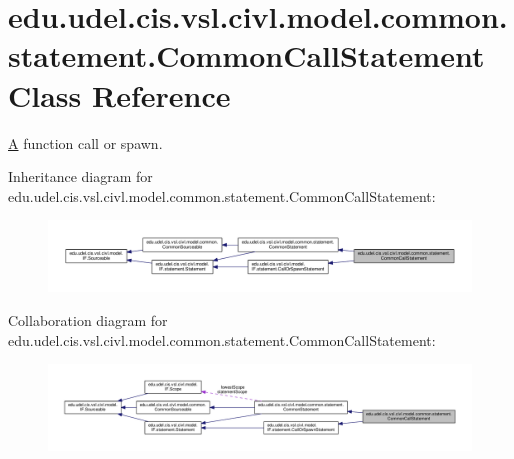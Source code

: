 \hypertarget{classedu_1_1udel_1_1cis_1_1vsl_1_1civl_1_1model_1_1common_1_1statement_1_1CommonCallStatement}{}\section{edu.\+udel.\+cis.\+vsl.\+civl.\+model.\+common.\+statement.\+Common\+Call\+Statement Class Reference}
\label{classedu_1_1udel_1_1cis_1_1vsl_1_1civl_1_1model_1_1common_1_1statement_1_1CommonCallStatement}


\hyperlink{structA}{A} function call or spawn.  




Inheritance diagram for edu.\+udel.\+cis.\+vsl.\+civl.\+model.\+common.\+statement.\+Common\+Call\+Statement\+:
\nopagebreak
\begin{figure}[H]
\begin{center}
\leavevmode
\includegraphics[width=350pt]{classedu_1_1udel_1_1cis_1_1vsl_1_1civl_1_1model_1_1common_1_1statement_1_1CommonCallStatement__inherit__graph}
\end{center}
\end{figure}


Collaboration diagram for edu.\+udel.\+cis.\+vsl.\+civl.\+model.\+common.\+statement.\+Common\+Call\+Statement\+:
\nopagebreak
\begin{figure}[H]
\begin{center}
\leavevmode
\includegraphics[width=350pt]{classedu_1_1udel_1_1cis_1_1vsl_1_1civl_1_1model_1_1common_1_1statement_1_1CommonCallStatement__coll__graph}
\end{center}
\end{figure}
